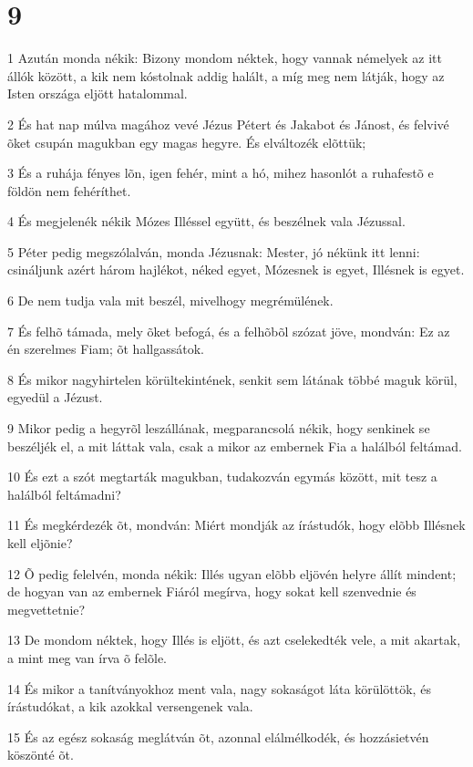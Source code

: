 \chapter{9}

\par 1 Azután monda nékik: Bizony mondom néktek, hogy vannak némelyek az itt állók között, a kik nem kóstolnak addig halált, a míg meg nem látják, hogy az Isten országa eljött hatalommal.
\par 2 És hat nap múlva magához vevé Jézus Pétert és Jakabot és Jánost, és felvivé õket csupán magukban egy magas hegyre. És elváltozék elõttük;
\par 3 És a ruhája fényes lõn, igen fehér, mint a hó, mihez hasonlót a ruhafestõ e földön nem fehéríthet.
\par 4 És megjelenék nékik Mózes Illéssel együtt, és beszélnek vala Jézussal.
\par 5 Péter pedig megszólalván, monda Jézusnak: Mester, jó nékünk itt lenni: csináljunk azért három hajlékot, néked egyet, Mózesnek is egyet, Illésnek is egyet.
\par 6 De nem tudja vala mit beszél, mivelhogy megrémülének.
\par 7 És felhõ támada, mely õket befogá, és a felhõbõl szózat jöve, mondván: Ez az én szerelmes Fiam; õt hallgassátok.
\par 8 És mikor nagyhirtelen körültekintének, senkit sem látának többé maguk körül, egyedül a Jézust.
\par 9 Mikor pedig a hegyrõl leszállának, megparancsolá nékik, hogy senkinek se beszéljék el, a mit láttak vala, csak a mikor az embernek Fia a halálból feltámad.
\par 10 És ezt a szót megtarták magukban, tudakozván egymás között, mit tesz a halálból feltámadni?
\par 11 És megkérdezék õt, mondván: Miért mondják az írástudók, hogy elõbb Illésnek kell eljõnie?
\par 12 Õ pedig felelvén, monda nékik: Illés ugyan elõbb eljövén helyre állít mindent; de hogyan van az embernek Fiáról megírva, hogy sokat kell szenvednie és megvettetnie?
\par 13 De mondom néktek, hogy Illés is eljött, és azt cselekedték vele, a mit akartak, a mint meg van  írva õ felõle.
\par 14 És mikor a tanítványokhoz ment vala, nagy sokaságot láta körülöttök, és írástudókat, a kik azokkal versengenek vala.
\par 15 És az egész sokaság meglátván õt, azonnal elálmélkodék, és hozzásietvén köszönté õt.
